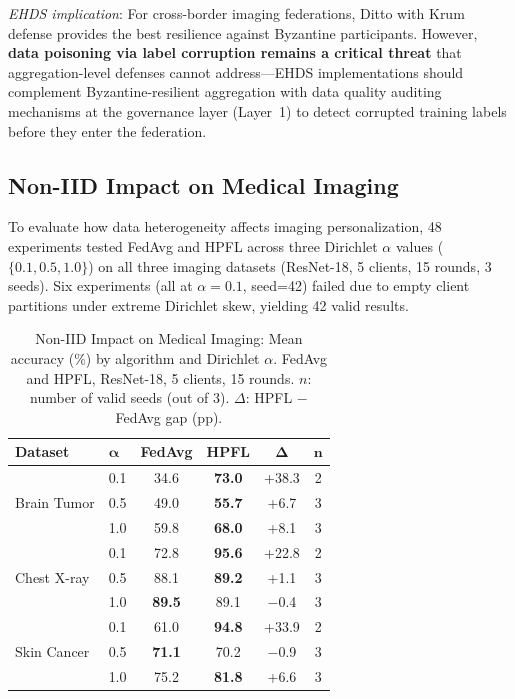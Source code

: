 \documentclass[conference]{IEEEtran}
\begin{document}
\textit{EHDS implication}: For cross-border imaging federations, Ditto with Krum defense provides the best resilience against Byzantine participants. However, \textbf{data poisoning via label corruption remains a critical threat} that aggregation-level defenses cannot address---EHDS implementations should complement Byzantine-resilient aggregation with data quality auditing mechanisms at the governance layer (Layer~1) to detect corrupted training labels before they enter the federation.


\subsection{Non-IID Impact on Medical Imaging}
\label{sec:noniid_imaging}

To evaluate how data heterogeneity affects imaging personalization, 48 experiments tested FedAvg and HPFL across three Dirichlet $\alpha$ values ($\{0.1, 0.5, 1.0\}$) on all three imaging datasets (ResNet-18, 5 clients, 15 rounds, 3 seeds). Six experiments (all at $\alpha{=}0.1$, seed=42) failed due to empty client partitions under extreme Dirichlet skew, yielding 42 valid results.

\begin{table}[htbp]
\centering
\caption{Non-IID Impact on Medical Imaging: Mean accuracy (\%) by algorithm and Dirichlet $\alpha$. FedAvg and HPFL, ResNet-18, 5 clients, 15 rounds. $n$: number of valid seeds (out of 3). $\Delta$: HPFL $-$ FedAvg gap (pp).}
\label{tab:noniid_imaging}
\small
\begin{tabular}{llcccc}
\toprule
\textbf{Dataset} & $\boldsymbol{\alpha}$ & \textbf{FedAvg} & \textbf{HPFL} & $\boldsymbol{\Delta}$ & $\boldsymbol{n}$ \\
\midrule
\multirow{3}{*}{Brain Tumor} & 0.1 & 34.6 & \textbf{73.0} & +38.3 & 2 \\
 & 0.5 & 49.0 & \textbf{55.7} & +6.7 & 3 \\
 & 1.0 & 59.8 & \textbf{68.0} & +8.1 & 3 \\
\midrule
\multirow{3}{*}{Chest X-ray} & 0.1 & 72.8 & \textbf{95.6} & +22.8 & 2 \\
 & 0.5 & 88.1 & \textbf{89.2} & +1.1 & 3 \\
 & 1.0 & \textbf{89.5} & 89.1 & $-$0.4 & 3 \\
\midrule
\multirow{3}{*}{Skin Cancer} & 0.1 & 61.0 & \textbf{94.8} & +33.9 & 2 \\
 & 0.5 & \textbf{71.1} & 70.2 & $-$0.9 & 3 \\
 & 1.0 & 75.2 & \textbf{81.8} & +6.6 & 3 \\
\bottomrule
\end{tabular}
\end{table}
\end{document}
